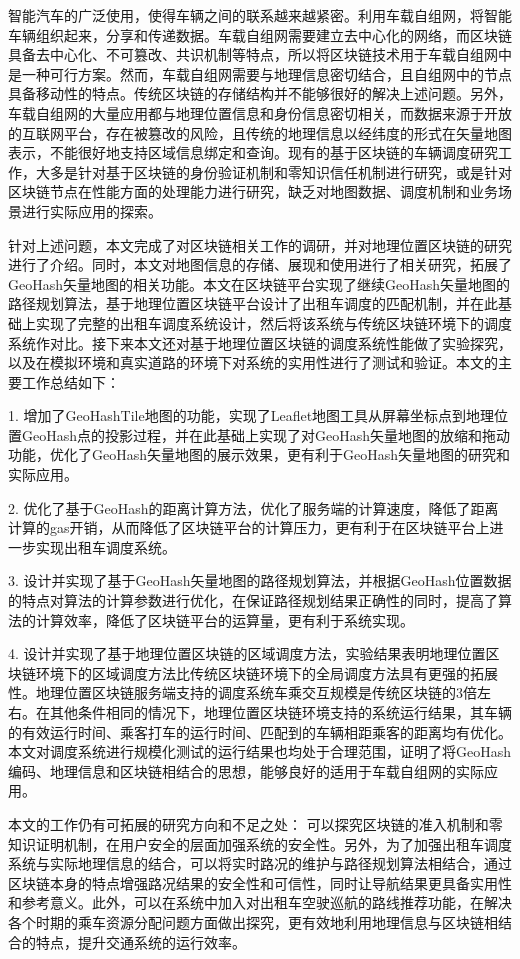 

\begin{conclusion}

智能汽车的广泛使用，使得车辆之间的联系越来越紧密。利用车载自组网，将智能车辆组织起来，分享和传递数据。车载自组网需要建立去中心化的网络，而区块链具备去中心化、不可篡改、共识机制等特点，所以将区块链技术用于车载自组网中是一种可行方案。然而，车载自组网需要与地理信息密切结合，且自组网中的节点具备移动性的特点。传统区块链的存储结构并不能够很好的解决上述问题。另外，车载自组网的大量应用都与地理位置信息和身份信息密切相关，而数据来源于开放的互联网平台，存在被篡改的风险，且传统的地理信息以经纬度的形式在矢量地图表示，不能很好地支持区域信息绑定和查询。现有的基于区块链的车辆调度研究工作，大多是针对基于区块链的身份验证机制和零知识信任机制进行研究，或是针对区块链节点在性能方面的处理能力进行研究，缺乏对地图数据、调度机制和业务场景进行实际应用的探索。

针对上述问题，本文完成了对区块链相关工作的调研，并对地理位置区块链的研究进行了介绍。同时，本文对地图信息的存储、展现和使用进行了相关研究，拓展了GeoHash矢量地图的相关功能。本文在区块链平台实现了继续GeoHash矢量地图的路径规划算法，基于地理位置区块链平台设计了出租车调度的匹配机制，并在此基础上实现了完整的出租车调度系统设计，然后将该系统与传统区块链环境下的调度系统作对比。接下来本文还对基于地理位置区块链的调度系统性能做了实验探究，以及在模拟环境和真实道路的环境下对系统的实用性进行了测试和验证。本文的主要工作总结如下：

1. 增加了GeoHashTile地图的功能，实现了Leaflet地图工具从屏幕坐标点到地理位置GeoHash点的投影过程，并在此基础上实现了对GeoHash矢量地图的放缩和拖动功能，优化了GeoHash矢量地图的展示效果，更有利于GeoHash矢量地图的研究和实际应用。

2. 优化了基于GeoHash的距离计算方法，优化了服务端的计算速度，降低了距离计算的gas开销，从而降低了区块链平台的计算压力，更有利于在区块链平台上进一步实现出租车调度系统。

3. 设计并实现了基于GeoHash矢量地图的路径规划算法，并根据GeoHash位置数据的特点对算法的计算参数进行优化，在保证路径规划结果正确性的同时，提高了算法的计算效率，降低了区块链平台的运算量，更有利于系统实现。

4. 设计并实现了基于地理位置区块链的区域调度方法，实验结果表明地理位置区块链环境下的区域调度方法比传统区块链环境下的全局调度方法具有更强的拓展性。地理位置区块链服务端支持的调度系统车乘交互规模是传统区块链的3倍左右。在其他条件相同的情况下，地理位置区块链环境支持的系统运行结果，其车辆的有效运行时间、乘客打车的运行时间、匹配到的车辆相距乘客的距离均有优化。本文对调度系统进行规模化测试的运行结果也均处于合理范围，证明了将GeoHash编码、地理信息和区块链相结合的思想，能够良好的适用于车载自组网的实际应用。

本文的工作仍有可拓展的研究方向和不足之处：
可以探究区块链的准入机制和零知识证明机制，在用户安全的层面加强系统的安全性。另外，为了加强出租车调度系统与实际地理信息的结合，可以将实时路况的维护与路径规划算法相结合，通过区块链本身的特点增强路况结果的安全性和可信性，同时让导航结果更具备实用性和参考意义。此外，可以在系统中加入对出租车空驶巡航的路线推荐功能，在解决各个时期的乘车资源分配问题方面做出探究，更有效地利用地理信息与区块链相结合的特点，提升交通系统的运行效率。

\end{conclusion}